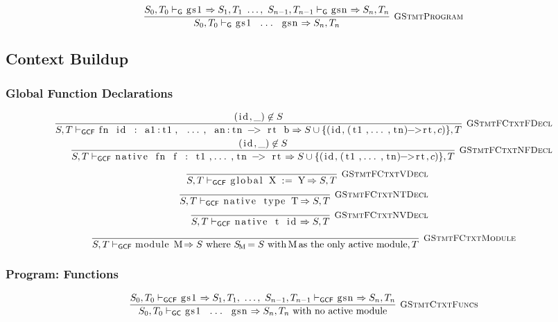 \documentclass{article}
\newcommand{\code}[1]{\lstinline[columns=fixed]{#1}}
\newcommand{\drmrule}[5]{\frac{#1}{#2\vdash_{\mathsf{#3}}#4}\textsc{\ \small{#5}}}
\newcommand{\ruleapp}[1]{\vdash_{\mathsf{#1}}}
\newcommand{\mc}[1]{\textnormal{\code{#1}}}
\begin{document}
				\begin{align*}
					\drmrule{S_0,T_0 \ruleapp{G} \mc{gs1} \Rightarrow S_1,T_1\ \dots,\ S_{n-1},T_{n-1} \ruleapp{G} \mc{gsn} \Rightarrow S_n,T_n}{S_0,T_0}{G}{\mc{gs1 ... gsn} \Rightarrow S_n,T_n}{GStmtProgram}
				\end{align*}
				
		\subsection{Context Buildup}
		
			\subsubsection{Global Function Declarations}
			
				\begin{align*}
					\drmrule{(\mc{id},\_) \not\in S}{S,T}{GCF}{\mc{fn id : a1:t1, ..., an:tn -> rt b} \Rightarrow S \cup \{(\mc{id}, \mc{(t1,...,tn)->rt}, c)\},T}{GStmtFCtxtFDecl}\\
					\drmrule{(\mc{id},\_) \not\in S}{S,T}{GCF}{\mc{native fn f : t1,...,tn -> rt} \Rightarrow S \cup \{(\mc{id}, \mc{(t1,...,tn)->rt}, c)\},T}{GStmtFCtxtNFDecl}
				\end{align*}\begin{align*}
					\drmrule{}{S,T}{GCF}{\mc{global X := Y} \Rightarrow S,T}{GStmtFCtxtVDecl}\\
					\drmrule{}{S,T}{GCF}{\mc{native type T} \Rightarrow S,T}{GStmtFCtxtNTDecl}\\
					\drmrule{}{S,T}{GCF}{\mc{native t id} \Rightarrow S,T}{GStmtFCtxtNVDecl}
				\end{align*}\begin{align*}
					\drmrule{}{S,T}{GCF}{\mc{module M} \Rightarrow S\textnormal{ where $S_{\mc{M}} = S$ with \code{M} as the only active module}, T}{GStmtFCtxtModule}
				\end{align*}
			
			\subsubsection{Program: Functions}
			
				\begin{align*}
					\drmrule{S_0,T_0 \ruleapp{GCF} \mc{gs1} \Rightarrow S_1,T_1,\ \dots,\ S_{n-1},T_{n-1} \ruleapp{GCF} \mc{gsn} \Rightarrow S_n,T_n}{S_0,T_0}{GC}{\mc{gs1 ... gsn} \Rightarrow S_n,T_n \textnormal{ with no active module}}{GStmtCtxtFuncs}
				\end{align*}
			
\end{document}

